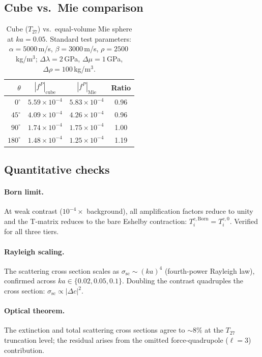 \documentclass[11pt,a4paper]{article}
\newcommand{\D}{\Delta}
\theoremstyle{plain}
\theoremstyle{definition}
\theoremstyle{remark}
\begin{document}
\subsection{Cube vs.\ Mie comparison}

\begin{table}[ht]
\centering
\renewcommand{\arraystretch}{1.2}
\begin{tabular}{rccc}
\toprule
$\theta$ & $|f^P|_\mathrm{cube}$ & $|f^P|_\mathrm{Mie}$ & Ratio \\
\midrule
$0^\circ$   & $5.59 \times 10^{-4}$ & $5.83 \times 10^{-4}$ & 0.96 \\
$45^\circ$  & $4.09 \times 10^{-4}$ & $4.26 \times 10^{-4}$ & 0.96 \\
$90^\circ$  & $1.74 \times 10^{-4}$ & $1.75 \times 10^{-4}$ & 1.00 \\
$180^\circ$ & $1.48 \times 10^{-4}$ & $1.25 \times 10^{-4}$ & 1.19 \\
\bottomrule
\end{tabular}
\caption{Cube ($T_{27}$) vs.\ equal-volume Mie sphere at $ka = 0.05$.
Standard test parameters: $\alpha = 5000$\,m/s, $\beta = 3000$\,m/s,
$\rho = 2500$\,kg/m$^3$; $\D\lambda = 2$\,GPa, $\D\mu = 1$\,GPa,
$\D\rho = 100$\,kg/m$^3$.}
\label{tab:cube-vs-mie}
\end{table}

\subsection{Quantitative checks}

\paragraph{Born limit.}
At weak contrast ($10^{-4}\times$ background), all amplification
factors reduce to unity and the T-matrix reduces to the bare Eshelby
contraction: $T^{c,\mathrm{Born}}_i = T^{c,0}_i$.  Verified for all
three tiers.

\paragraph{Rayleigh scaling.}
The scattering cross section scales as $\sigma_\mathrm{sc} \sim (ka)^4$
(fourth-power Rayleigh law), confirmed across $ka \in \{0.02, 0.05, 0.1\}$.
Doubling the contrast quadruples the cross section:
$\sigma_\mathrm{sc} \propto |\D c|^2$.

\paragraph{Optical theorem.}
The extinction and total scattering cross sections agree to $\sim 8\%$
at the $T_{27}$ truncation level; the residual arises from the omitted
force-quadrupole ($\ell = 3$) contribution.
\end{document}
